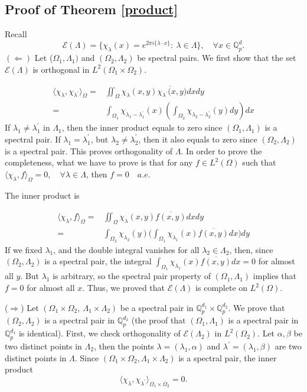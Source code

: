 \documentclass[a4paper,12pt]{amsart}
\def\Q{\mathbb{Q}}
\begin{document}
\subsection{Proof of Theorem \ref{product}}

Recall
$$
\mathcal{E}(\Lambda)=\Big\{\chi_\lambda(x)=e^{2\pi i\{\lambda\cdot x\}}:
\ \lambda\in\Lambda\Big\},\quad \forall x\in\Q_p^d.
$$
$(\Leftarrow)$ Let (\(\Omega_1, \Lambda_1)\) and \((\Omega_2, \Lambda_2)\) be spectral pairs.
We first show that the set $\mathcal{E}(\Lambda)$ is orthogonal in $L^2(\Omega_1\times\Omega_2)$.

\[\begin{split}
\langle\chi_\lambda,\chi_{\lambda^{\prime}}\rangle_\Omega
=&\iint_\Omega\chi_\lambda(x,y)\overline{\chi_{\lambda^{\prime}}(x,y})dxdy\\
=&\int_{\Omega_1}\chi_{\lambda_1-\lambda_1^{\prime}}(x)(\int_{\Omega_2}\chi_{\lambda_2-\lambda_2^{\prime}}(y)dy)dx
\end{split}\]
If $\lambda_1\neq\lambda_1^{\prime}$ in $\Lambda_1$, then the inner product equals to zero since $(\Omega_1,\Lambda_1)$
is a spectral pair.
If $\lambda_1=\lambda_1^{\prime}$, but $\lambda_2\neq\lambda_2^{\prime}$, then it also equals to zero
since $(\Omega_2,\Lambda_2)$ is a spectral pair. This proves orthogonality of $\Lambda$.
In order to prove the completeness, what we have to prove is that for any $f\in L^2(\Omega)$
such that $\langle \chi_\lambda,f\rangle_\Omega=0,\quad \forall \lambda\in\Lambda$, then $f=0 \quad a.e.$

The inner product is

\[\begin{split}
\langle \chi_\lambda, f\rangle_\Omega
=&\iint_\Omega\chi_\lambda(x,y)\overline{f(x,y)}dxdy\\
=&\int_{\Omega_2}\chi_{\lambda_2}(y)\bigg(\int_{\Omega_1}\chi_{\lambda_1}(x)\overline{f(x,y)}dx\bigg)dy
\end{split}\]
If we fixed $\lambda_1$, and the double integral vanishes for all $\lambda_2\in\Lambda_2$,
then, since $(\Omega_2,\Lambda_2)$ is a spectral pair, the integral
$\int_{\Omega_1}\chi_{\lambda_1}(x)\overline{f(x,y)}dx=0$ for
almost all $y$. But $\lambda_1$ is arbitrary, so the spectral pair property of $(\Omega_1,\Lambda_1)$
implies that $f=0$ for almost all $x$. Thus, we proved that $\mathcal{E}(\Lambda)$ is
complete on $L^2(\Omega)$.

(\( \Rightarrow\)) Let \((\Omega_1\times\Omega_2,\ \Lambda_1\times\Lambda_2)\) be a spectral pair in $\Q_p^{d_1}\times\Q_p^{d_2}$.
We prove that \((\Omega_2, \Lambda_2)\) is a spectral pair in $\Q_p^{d_2}$ (the proof that \((\Omega_1, \Lambda_1)\) is a
spectral pair in $\Q_p^{d_1}$ is identical).
First, we check orthogonality of $\mathcal{E}(\Lambda_2)$ in $L^2(\Omega_2)$. Let $\alpha, \beta$ be two distinct points in $\Lambda_2$,
then the points $\lambda=(\lambda_1, \alpha)$ and $\lambda^{\prime}=(\lambda_1, \beta)$ are
two distinct points in $\Lambda$. Since $(\Omega_1\times\Omega_2, \Lambda_1\times\Lambda_2)$ is a spectral pair, the inner product
$$
\langle \chi_\lambda, \chi_{\lambda^{\prime}}\rangle_{\Omega_1\times\Omega_2}=0.
$$
\end{document}
